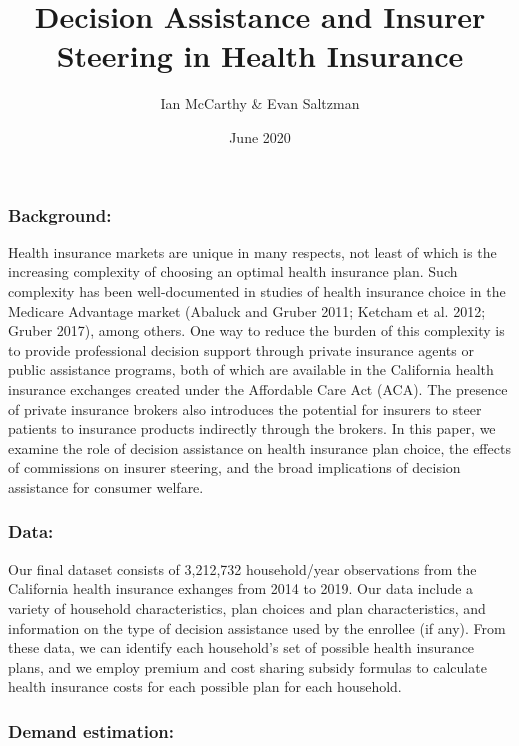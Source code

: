 \documentclass[
  11pt,
]{article}
\title{Decision Assistance and Insurer Steering in Health Insurance}
\author{Ian McCarthy \& Evan Saltzman}
\date{June 2020}
\begin{document}
\maketitle

\hypertarget{background}{%
\subsubsection{Background:}\label{background}}

Health insurance markets are unique in many respects, not least of which is the increasing complexity of choosing an optimal health insurance plan. Such complexity has been well-documented in studies of health insurance choice in the Medicare Advantage market (Abaluck and Gruber 2011; Ketcham et al. 2012; Gruber 2017), among others. One way to reduce the burden of this complexity is to provide professional decision support through private insurance agents or public assistance programs, both of which are available in the California health insurance exchanges created under the Affordable Care Act (ACA). The presence of private insurance brokers also introduces the potential for insurers to steer patients to insurance products indirectly through the brokers. In this paper, we examine the role of decision assistance on health insurance plan choice, the effects of commissions on insurer steering, and the broad implications of decision assistance for consumer welfare.

\hypertarget{data}{%
\subsubsection{Data:}\label{data}}

Our final dataset consists of 3,212,732 household/year observations from the California health insurance exhanges from 2014 to 2019. Our data include a variety of household characteristics, plan choices and plan characteristics, and information on the type of decision assistance used by the enrollee (if any). From these data, we can identify each household's set of possible health insurance plans, and we employ premium and cost sharing subsidy formulas to calculate health insurance costs for each possible plan for each household.

\hypertarget{demand-estimation}{%
\subsubsection{Demand estimation:}\label{demand-estimation}}
\end{document}
